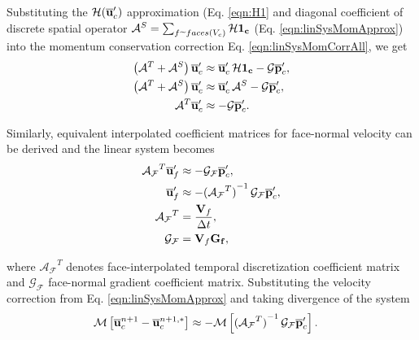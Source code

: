 \begin{enumerate}
\begin{itemize}
Substituting the $\mathcal{H}(\overline{\mathbf{u}}_c^\prime)$ approximation (Eq. \eqref{eqn:H1} and diagonal coefficient of discrete spatial operator $\mathcal{A}^S = \sumFV \mathcal{H} \mathbf{1_c}$ (Eq. \eqref{eqn:linSysMomApprox}) into the momentum conservation correction Eq. \eqref{eqn:linSysMomCorrAll}, we get
\begin{align}
\begin{split}
\left( \mathcal{A}^T + \mathcal{A}^S \right) \overline{\mathbf{u}}_c^\prime &\approx \overline{\mathbf{u}}_c^\prime \, \mathcal{H}\mathbf{1_c} -\mathcal{G}\overline{\mathbf{p}}_c^\prime,
\\
\left( \mathcal{A}^T + \mathcal{A}^S \right) \overline{\mathbf{u}}_c^\prime &\approx \overline{\mathbf{u}}_c^\prime \, \mathcal{A}^S -\mathcal{G}\overline{\mathbf{p}}_c^\prime,
\\
\mathcal{A}^T \overline{\mathbf{u}}_c^\prime &\approx -\mathcal{G}\overline{\mathbf{p}}_c^\prime.
\end{split}
\label{eqn:linSysMomCorrCell}
\end{align}

Similarly, equivalent interpolated coefficient matrices for face-normal velocity can be derived and the linear system becomes
\begin{align}
\begin{split}
\mathcal{A_F}^T \overline{\mathbf{u}}_f^\prime &\approx -\mathcal{G_F}\overline{\mathbf{p}}_c^\prime,
\\
\overline{\mathbf{u}}_f^\prime &\approx - {(\mathcal{A_F}^T )}^{-1} \, \mathcal{G_F}\overline{\mathbf{p}}_c^\prime,
\\
\mathcal{A_F}^T &= \frac{\mathbf{V}_f}{\Delta t},
\\
\mathcal{G_F} &= \mathbf{V}_f \mathbf{G_f},
\end{split}
\label{eqn:linSysMomCorrFace}
\end{align}

where $\mathcal{A_F}^T$ denotes face-interpolated temporal discretization coefficient matrix and $\mathcal{G_F}$ face-normal gradient coefficient matrix. Substituting the velocity correction from Eq. \eqref{eqn:linSysMomApprox} and taking divergence of the system
\begin{align}
\begin{split}
\mathcal{M} \left[ \overline{\mathbf{u}}_c^{n+1} - \overline{\mathbf{u}}_c^{n+1,*} \right] &\approx 
- \mathcal{M} \left[ {(\mathcal{A_F}^T )}^{-1} \, \mathcal{G_F}\overline{\mathbf{p}}_c^\prime \right].
\end{split}
\label{eqn:linSysMomCorrDiv}
\end{align}


\end{itemize}
\end{enumerate}
